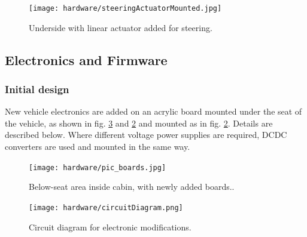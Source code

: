 \documentclass[a4paper]{article}
\begin{document}
\begin{figure}[h]
	\texttt{[image: hardware/steeringActuatorMounted.jpg]}
	\caption{Underside with linear actuator added for steering.}
	\label{fig:actuatorMounted}
\end{figure}


\subsection{Electronics and Firmware}

\subsubsection{Initial design}

New vehicle electronics are added on an acrylic board mounted under the seat of the vehicle, as shown in fig. \ref{fig:circuitDiagram} and \ref{fig:actuatorMounted} and mounted as in fig. \ref{fig:actuatorMounted}. Details are described below.  Where different voltage power supplies are required, DCDC converters are used and mounted in the same way.

\begin{figure}[h]
	\texttt{[image: hardware/pic\_boards.jpg]}
	\caption{Below-seat area inside cabin, with newly added boards..}
	\label{fig:actuatorMounted}
\end{figure}

\begin{figure}[h]
	\texttt{[image: hardware/circuitDiagram.png]}
	\caption{Circuit diagram for electronic modifications.}
	\label{fig:circuitDiagram}
\end{figure}
\end{document}
